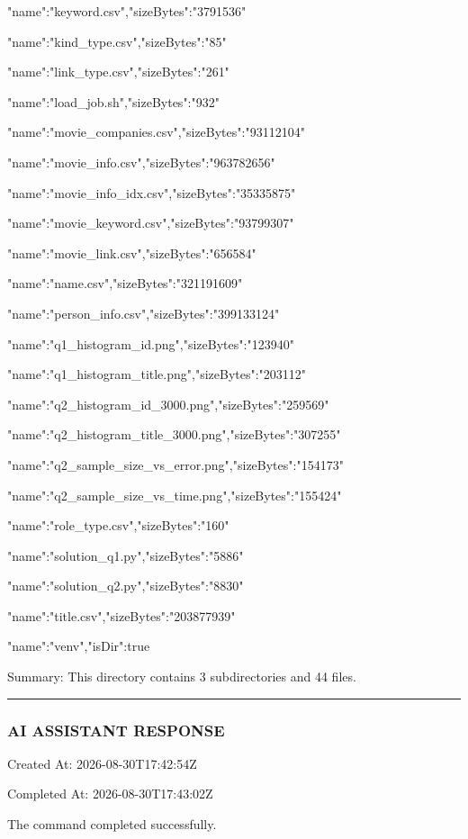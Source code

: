 \documentclass[11pt,a4paper]{article}
\begin{document}
{{"name":"keyword.csv","sizeBytes":"3791536"}

{"name":"kind\_type.csv","sizeBytes":"85"}

{"name":"link\_type.csv","sizeBytes":"261"}

{"name":"load\_job.sh","sizeBytes":"932"}

{"name":"movie\_companies.csv","sizeBytes":"93112104"}

{"name":"movie\_info.csv","sizeBytes":"963782656"}

{"name":"movie\_info\_idx.csv","sizeBytes":"35335875"}

{"name":"movie\_keyword.csv","sizeBytes":"93799307"}

{"name":"movie\_link.csv","sizeBytes":"656584"}

{"name":"name.csv","sizeBytes":"321191609"}

{"name":"person\_info.csv","sizeBytes":"399133124"}

{"name":"q1\_histogram\_id.png","sizeBytes":"123940"}

{"name":"q1\_histogram\_title.png","sizeBytes":"203112"}

{"name":"q2\_histogram\_id\_3000.png","sizeBytes":"259569"}

{"name":"q2\_histogram\_title\_3000.png","sizeBytes":"307255"}

{"name":"q2\_sample\_size\_vs\_error.png","sizeBytes":"154173"}

{"name":"q2\_sample\_size\_vs\_time.png","sizeBytes":"155424"}

{"name":"role\_type.csv","sizeBytes":"160"}

{"name":"solution\_q1.py","sizeBytes":"5886"}

{"name":"solution\_q2.py","sizeBytes":"8830"}

{"name":"title.csv","sizeBytes":"203877939"}

{"name":"venv","isDir":true}


Summary: This directory contains 3 subdirectories and 44 files.


\hrule

\subsubsection{AI ASSISTANT RESPONSE}

Created At: 2026-08-30T17:42:54Z

Completed At: 2026-08-30T17:43:02Z


The command completed successfully.

}
\end{document}
